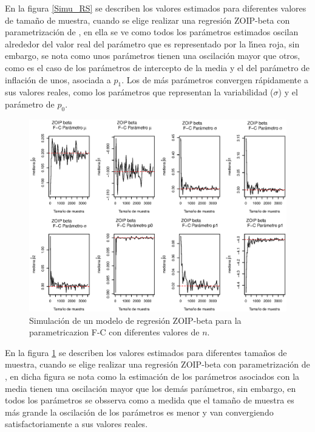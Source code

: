 En la figura \ref{Simu_RS} se describen los valores estimados para diferentes valores de tama\~{n}o de muestra, cuando se elige realizar una regresi\'{o}n ZOIP-beta con parametrizaci\'{o}n de \cite{Stasinopoulos2}, en ella se ve como todos los par\'{a}metros estimados oscilan alrededor del valor real del par\'{a}metro que es representado por la l\'{\i}nea roja, sin embargo, se nota como unos par\'{a}metros tienen una oscilaci\'{o}n mayor que otros, como es el caso de los par\'{a}metros de intercepto de la media y el del par\'{a}metro de inflaci\'{o}n de unos, asociada a $p_1$. Los de m\'{a}s par\'{a}metros convergen r\'{a}pidamente a sus valores reales, como los par\'{a}metros que representan la variabilidad ($\sigma$) y el par\'{a}metro de $p_0$.   

\begin{figure}
	\begin{center}
		\includegraphics[scale=0.5]{Converg_FC.eps}	
		\caption{Simulaci\'{o}n de un modelo de regresi\'{o}n ZOIP-beta para la parametricazion F-C con diferentes valores de $n$.}
		\label{Simu_FC}
	\end{center}
\end{figure}

En la figura \ref{Simu_FC} se describen los valores estimados para diferentes tama\~{n}os de muestra, cuando se elige realizar una regresi\'{o}n ZOIP-beta con parametrizaci\'{o}n de \cite{Ferrari2}, en dicha figura se nota como la estimaci\'{o}n de los par\'{a}metros asociados con la media tienen una oscilaci\'{o}n mayor que los dem\'{a}s par\'{a}metros, sin embargo, en todos los par\'{a}metros se obsserva como a medida que el tama\~{n}o de muestra es m\'{a}s grande la oscilaci\'{o}n de los par\'{a}metros es menor y van convergiendo satisfactoriamente a sus valores reales.

